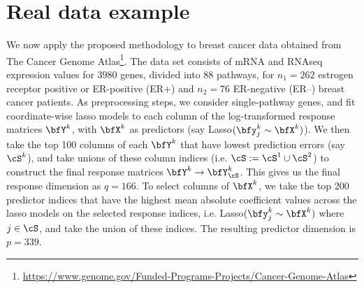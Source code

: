\section{Real data example}
\label{sec:secreal}
We now apply the proposed methodology to breast cancer data obtained from The Cancer Genome Atlas\footnote{\url{https://www.genome.gov/Funded-Programs-Projects/Cancer-Genome-Atlas}}. The data set consists of mRNA and RNAseq expression values for $3980$ genes, divided into 88 pathways, for $n_1 = 262$ estrogen receptor positive or ER-positive (ER+) and $n_2 = 76$ ER-negative (ER--) breast cancer patients. 
As preprocessing steps, we consider single-pathway genes, and fit coordinate-wise lasso models to each column of the log-transformed response matrices $\bfY^k$, with $\bfX^k$ as predictors (say Lasso$(\bfy_{j}^k \sim \bfX^k)$). We then take the top 100 columns of each $\bfY^k$ that have lowest prediction errors (say $\cS^k$), and take unions of these column indices (i.e. $\cS := \cS^1 \cup \cS^2$) to construct the final response matrices $\bfY^k \rightarrow \bfY^k_\cS$. This gives us the final response dimension as $q = 166$. To select columns of $\bfX^k$, we take the top 200 predictor indices that have the highest mean absolute coefficient values across the lasso models on the selected response indices, i.e. Lasso$(\bfy_{j}^k \sim \bfX^k)$ where $j \in \cS$, and take the union of these indices. The resulting predictor dimension is $p = 339$.

